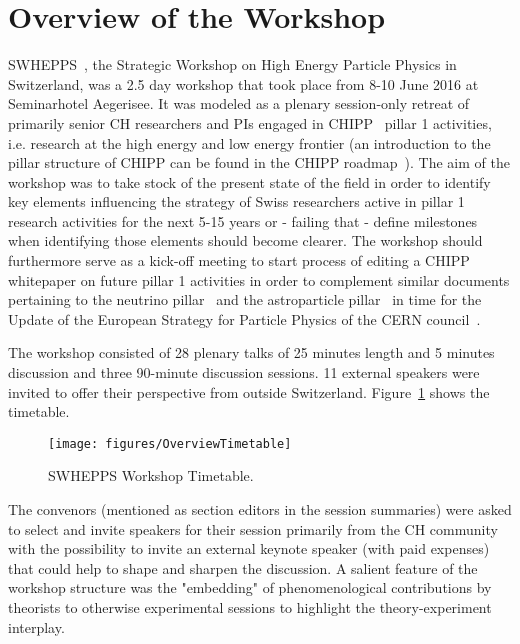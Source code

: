 \section{Overview of the Workshop}\label{Overview}

\noindent SWHEPPS~\cite{workshopindico},  the Strategic Workshop on High Energy Particle Physics in Switzerland, was a 2.5 day workshop that took place from 8-10 June 2016 at 
Seminarhotel Aegerisee.   It was  modeled as a plenary session-only retreat of primarily senior CH researchers and PIs engaged in CHIPP~\cite{chipp} pillar 1 activities, 
i.e. research at the high energy and low energy frontier (an introduction to the pillar structure of CHIPP can be found in the CHIPP roadmap~\cite{roadmap}). The aim  of the workshop
 was to take stock of the present state of the field in order to identify key elements influencing the strategy of Swiss researchers active in pillar 1 research activities for the next 5-15 years or
 - failing that - define milestones when identifying those elements should become clearer. The workshop should furthermore serve as a kick-off meeting to start  process of editing a
 CHIPP whitepaper on future pillar 1 activities in order to  complement similar documents pertaining to the neutrino pillar~\cite{neutrinowhitepaper} and the astroparticle 
  pillar~\cite{astroparticlepillarwhitepaper} in time for the Update of the European Strategy for Particle Physics  of the  CERN council~\cite{europeanstrategy}. 

\medskip

\noindent The workshop consisted of 28 plenary talks of 25 minutes length and 5 minutes discussion  and three 90-minute discussion sessions. 11 external speakers were invited to offer
their perspective from outside Switzerland. Figure~\ref{fig:timetable} shows the timetable.
 
\begin{figure}[htb]
  \begin{center}\texttt{[image: figures/OverviewTimetable]}
    \caption{SWHEPPS Workshop Timetable.}   \label{fig:timetable}
 \end{center}
 \end{figure}

 \noindent The convenors (mentioned as section editors in the session summaries) were asked to select and invite speakers for their session primarily from the CH community with the possibility 
 to invite an external keynote speaker (with paid expenses) that could help to shape and sharpen the discussion.   A salient feature of the workshop structure was the "embedding" of 
 phenomenological contributions by theorists to otherwise experimental sessions  to highlight the theory-experiment interplay. 
 \medskip
 
